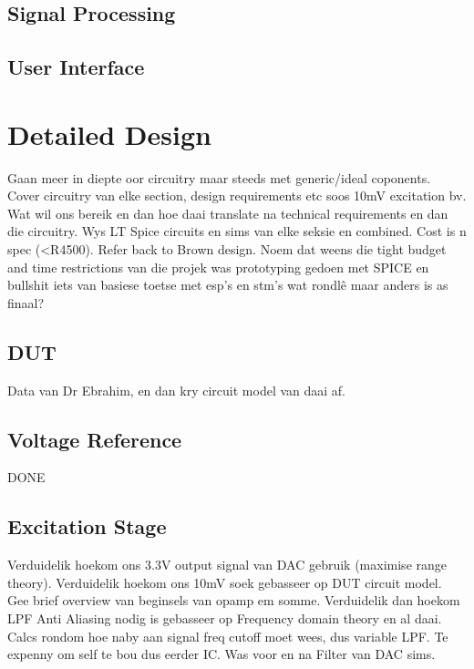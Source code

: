 \subsection{Signal Processing}

\subsection{User Interface}

\section{Detailed Design}
Gaan meer in diepte oor circuitry maar steeds met generic/ideal coponents. Cover circuitry van elke section, design requirements etc soos 10mV excitation bv. Wat wil ons bereik en dan hoe daai translate na technical requirements en dan die circuitry. Wys LT Spice circuits en sims van elke seksie en combined. Cost is n spec (<R4500). Refer back to Brown design. Noem dat weens die tight budget and time restrictions van die projek was prototyping gedoen met SPICE en bullshit iets van basiese toetse met esp's en stm's wat rondlê maar anders is as finaal?

\subsection{DUT}
Data van Dr Ebrahim, en dan kry circuit model van daai af.

\subsection{Voltage Reference}
DONE

\subsection{Excitation Stage}
Verduidelik hoekom ons 3.3V output signal van DAC gebruik (maximise range theory). Verduidelik hoekom ons 10mV soek gebasseer op DUT circuit model. Gee brief overview van beginsels van opamp em somme. Verduidelik dan hoekom LPF Anti Aliasing nodig is gebasseer op Frequency domain theory en al daai. Calcs rondom hoe naby aan signal freq cutoff moet wees, dus variable LPF. Te expenny om self te bou dus eerder IC. Was voor en na Filter van DAC sims.

